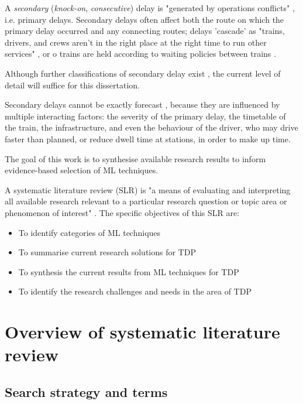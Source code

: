 \documentclass{article}
\begin{document}
A \textit{secondary} (\textit{knock-on}, \textit{consecutive}) delay is "generated by operations conflicts" \cite{cerreto_nielsen_harrod_nielsen_2016}, i.e. primary delays. Secondary delays often affect
both the route on which the primary delay occurred and any connecting routes; delays 'cascade' as "trains, drivers, and crews aren't in the right place at the right time to run other services" \cite{nr_knock_on_delays},
or o trains are held according to waiting policies between trains \cite{berger_et_al_2011}.

Although further classifications of secondary delay exist \cite{daamen_goverde_hansen_2008}, the current level of detail will suffice for this dissertation.

Secondary delays cannot be exactly forecast \cite{berger_et_al_2011}, \cite{milinkovic_markovic_veskovic_ivic_pavlovic_2013} because they are influenced by multiple interacting factors: the severity of the primary delay, the timetable of the train, the infrastructure, and even the behaviour of the driver, who may drive faster than planned, or reduce dwell time at stations, in order to make up time.

The goal of this work is to synthesise available research results to inform evidence-based selection of ML techniques.

A systematic literature review (SLR) is "a means of evaluating and interpreting all available research relevant to a particular research question or topic area or phenomenon of interest" \cite{williams_hollingsworth_2005}. The specific objectives of this SLR are:

\begin{itemize}
	\item To identify categories of ML techniques
	\item To summarise current research solutions for TDP
	\item To synthesis the current results from ML techniques for TDP
	\item To identify the research challenges and needs in the area of TDP
\end{itemize}

\section{Overview of systematic literature review}

\subsection{Search strategy and terms}
\end{document}

